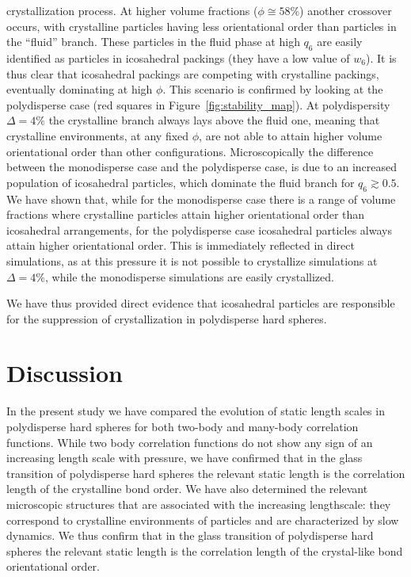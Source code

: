 \documentclass[twocolumn,superscriptaddress]{revtex4}
\begin{document}
crystallization process.
At higher volume fractions ($\phi\cong 58\%$) another crossover occurs, with
crystalline particles having less orientational order than particles in the ``fluid'' branch.
These particles in the fluid phase at high $q_6$ are easily identified as particles in icosahedral packings (they have
a low value of $w_6$).
It is thus clear that icosahedral packings are competing with crystalline packings, eventually dominating
at high $\phi$. This scenario is confirmed by looking at the polydisperse case (red squares in
Figure~\ref{fig:stability_map}).
At polydispersity $\Delta=4\%$ the crystalline branch always lays above the fluid one, meaning that
crystalline environments, at any fixed $\phi$, are not able to attain higher volume orientational order than other configurations.
Microscopically the difference between the monodisperse case and the polydisperse case, is due to an increased population of icosahedral particles, which dominate the fluid branch for $q_6\gtrsim 0.5$.
We have shown that, while for the monodisperse case there is a range of volume fractions where crystalline particles
attain higher orientational order than icosahedral arrangements, for the polydisperse case icosahedral
particles always attain higher orientational order.
This is immediately reflected in direct simulations,
as at this pressure it is not possible to crystallize simulations at $\Delta=4\%$, while the
monodisperse simulations are easily crystallized.

We have thus provided direct evidence that icosahedral particles are responsible for the suppression
of crystallization in polydisperse hard spheres.

\section{Discussion}\label{sec:discussion}

In the present study we have compared the evolution of static length scales in polydisperse hard spheres
for both two-body and many-body correlation functions. While two body correlation functions do not
show any sign of an increasing length scale with pressure, we have confirmed that in the glass transition of polydisperse hard spheres the relevant static length is the correlation length of the crystalline bond order.
We have also determined the relevant microscopic structures that are associated with the increasing
lengthscale: they correspond to crystalline environments of particles and are characterized by slow
dynamics.
We thus confirm that in the glass transition of polydisperse hard spheres the relevant static length is the correlation length of the crystal-like bond orientational order.
\end{document}
